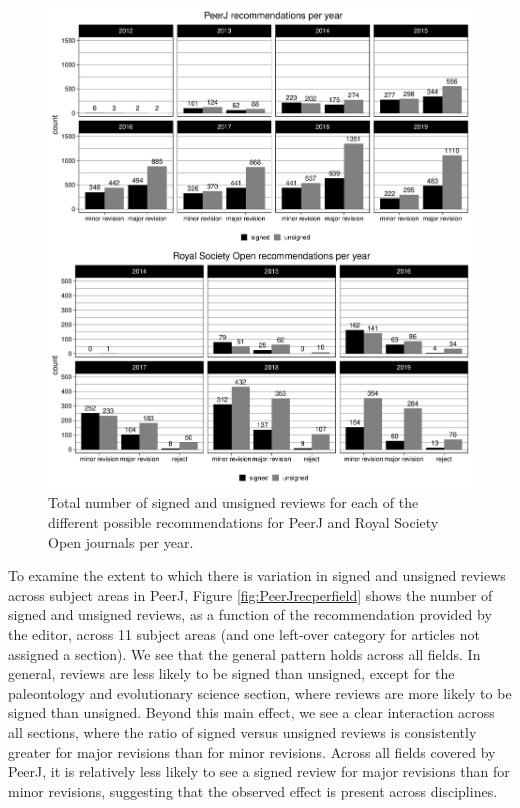 \documentclass[
  english,
  ,jou, a4paper,floatsintext]{apa6}
\begin{document}
\begin{figure}
\centering
\includegraphics{open_peer_review_files/figure-latex/recperyear-1.pdf}
\caption{\label{fig:recperyear}Total number of signed and unsigned reviews for each of the different possible recommendations for PeerJ and Royal Society Open journals per year.}
\end{figure}

\twocolumn

To examine the extent to which there is variation in signed and unsigned reviews across subject areas in PeerJ, Figure \ref{fig:PeerJrecperfield} shows the number of signed and unsigned reviews, as a function of the recommendation provided by the editor, across 11 subject areas (and one left-over category for articles not assigned a section). We see that the general pattern holds across all fields. In general, reviews are less likely to be signed than unsigned, except for the paleontology and evolutionary science section, where reviews are more likely to be signed than unsigned. Beyond this main effect, we see a clear interaction across all sections, where the ratio of signed versus unsigned reviews is consistently greater for major revisions than for minor revisions. Across all fields covered by PeerJ, it is relatively less likely to see a signed review for major revisions than for minor revisions, suggesting that the observed effect is present across disciplines.
\end{document}
